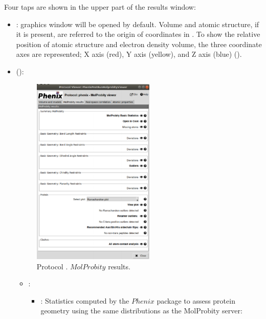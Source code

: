 \begin{itemize}
   Four taps are shown in the upper part of the results window:
   \begin{itemize}
     \item {}: \chimera graphics window will be opened by default. Volume and atomic structure, if it is present, are referred to the origin of coordinates in \chimera. To show the relative position of atomic structure and electron density volume, the three coordinate axes are represented; X axis (red), Y axis (yellow), and Z axis (blue) ().
     \item {} ():
        \begin{figure}[H]
         \centering 
         \captionsetup{width=.7\linewidth} 
         \includegraphics[width=0.55\textwidth]{Images_appendix/Fig145.pdf}
         \caption{Protocol . $MolProbity$ results.}
         \label{fig:app_protocol_molprobity_3}
        \end{figure}
        
        \begin{itemize}
         \item {}: 
          \begin{itemize}
           \item {}: Statistics computed by the $Phenix$ package to assess protein geometry using the same distributions as the MolProbity server:\setlength{\parindent}{12pt}
           

\end{itemize}
\end{itemize}
\end{itemize}
\end{itemize}
